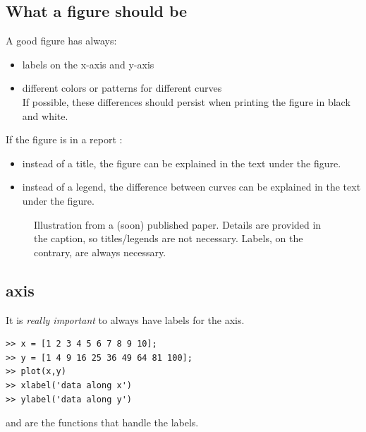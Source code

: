 	\subsection{What a figure should be}
		A good figure has {\color{red} \large always}:
		\begin{itemize}
			\item labels on the x-axis and y-axis
			\item different colors or patterns for different curves\\ If possible, these differences should persist when printing the figure in black and white.
		\end{itemize}
		If the figure is in a report :
		\begin{itemize}
			\item instead of a title, the figure can be explained in the text under the figure.
			\item instead of a legend, the difference between curves can be explained in the text under the figure.
		\end{itemize}
	\begin{figure}
		\center
		\caption{
			Illustration from a (soon) published paper. Details are provided in the caption, so titles/legends are not necessary. Labels, on the contrary, are always necessary.
			}
		\label{fig-beautiful_plot}
	\end{figure}	
	\subsection{axis}
		It is \emph{really important} to always have labels for the axis.
\begin{lstlisting}
>> x = [1 2 3 4 5 6 7 8 9 10];
>> y = [1 4 9 16 25 36 49 64 81 100];
>> plot(x,y)
>> xlabel('data along x')
>> ylabel('data along y')
\end{lstlisting}
		 and  are the \matlab functions that handle the labels.

